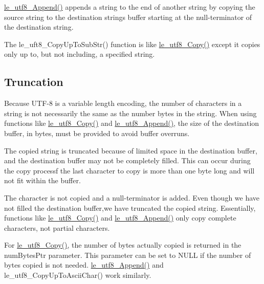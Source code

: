 {\ttfamily \hyperlink{le__utf8_8h_ade7dfb60b18574dc62c49b86c025579b}{le\+\_\+utf8\+\_\+\+Append()}} appends a string to the end of another string by copying the source string to the destination string\textquotesingle{}s buffer starting at the null-\/terminator of the destination string.

The {\ttfamily le\+\_\+uft8\+\_\+\+Copy\+Up\+To\+Sub\+Str()} function is like \hyperlink{le__utf8_8h_aa5ae72c01396c106fdf3b4741ead7477}{le\+\_\+utf8\+\_\+\+Copy()} except it copies only up to, but not including, a specified string.\hypertarget{c_utf8_utf8_trunc}{}\subsection{Truncation}\label{c_utf8_utf8_trunc}
Because U\+T\+F-\/8 is a variable length encoding, the number of characters in a string is not necessarily the same as the number bytes in the string. When using functions like \hyperlink{le__utf8_8h_aa5ae72c01396c106fdf3b4741ead7477}{le\+\_\+utf8\+\_\+\+Copy()} and \hyperlink{le__utf8_8h_ade7dfb60b18574dc62c49b86c025579b}{le\+\_\+utf8\+\_\+\+Append()}, the size of the destination buffer, in bytes, must be provided to avoid buffer overruns.

The copied string is truncated because of limited space in the destination buffer, and the destination buffer may not be completely filled. This can occur during the copy processf the last character to copy is more than one byte long and will not fit within the buffer.

The character is not copied and a null-\/terminator is added. Even though we have not filled the destination buffer,we have truncated the copied string. Essentially, functions like \hyperlink{le__utf8_8h_aa5ae72c01396c106fdf3b4741ead7477}{le\+\_\+utf8\+\_\+\+Copy()} and \hyperlink{le__utf8_8h_ade7dfb60b18574dc62c49b86c025579b}{le\+\_\+utf8\+\_\+\+Append()} only copy complete characters, not partial characters.

For \hyperlink{le__utf8_8h_aa5ae72c01396c106fdf3b4741ead7477}{le\+\_\+utf8\+\_\+\+Copy()}, the number of bytes actually copied is returned in the num\+Bytes\+Ptr parameter. This parameter can be set to N\+U\+L\+L if the number of bytes copied is not needed. \hyperlink{le__utf8_8h_ade7dfb60b18574dc62c49b86c025579b}{le\+\_\+utf8\+\_\+\+Append()} and le\+\_\+utf8\+\_\+\+Copy\+Up\+To\+Ascii\+Char() work similarly.


